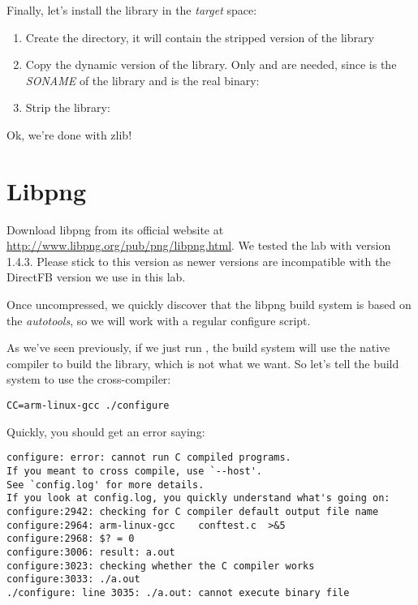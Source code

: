 Finally, let's install the library in the {\em target} space:

\begin{enumerate}
\item Create the  directory, it will contain the
  stripped version of the library
\item Copy the dynamic version of the library. Only  and  are needed, since  is the {\em SONAME} of the library and  is the real binary:\\
\item Strip the library:\\
\end{enumerate}

Ok, we're done with zlib!

\section{Libpng}

Download libpng from its official website at
\url{http://www.libpng.org/pub/png/libpng.html}. We tested the lab
with version 1.4.3. Please stick to this version as newer versions are
incompatible with the DirectFB version we use in this lab.

Once uncompressed, we quickly discover that the libpng build system is
based on the {\em autotools}, so we will work with a regular configure
script.

As we've seen previously, if we just run , the build
system will use the native compiler to build the library, which is not
what we want. So let's tell the build system to use the
cross-compiler:

\begin{verbatim}
CC=arm-linux-gcc ./configure
\end{verbatim}

Quickly, you should get an error saying:

\begin{verbatim}
configure: error: cannot run C compiled programs.
If you meant to cross compile, use `--host'.
See `config.log' for more details.
If you look at config.log, you quickly understand what's going on:
configure:2942: checking for C compiler default output file name
configure:2964: arm-linux-gcc    conftest.c  >&5
configure:2968: $? = 0
configure:3006: result: a.out
configure:3023: checking whether the C compiler works
configure:3033: ./a.out
./configure: line 3035: ./a.out: cannot execute binary file
\end{verbatim}


